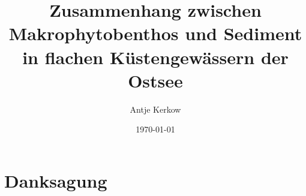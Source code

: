 



\pagestyle{empty}



\titlehead{Ernst Moritz Arndt Universität Greifswald\\
           Fachbereich Naturwissenschaften\\
           Institut für Landschaftsökologie und Naturschutz}

\subject{Diplomarbeit}

\title{Zusammenhang zwischen Makrophytobenthos und Sediment in flachen Küstengewässern der Ostsee}

\author{Antje Kerkow}

\date{\today} 

\publishers{Dozenten:\\PD Dr. Irmgard Blindow \\Prof. Dr. Hendrik Schubert}





\maketitle %
\clearpage

\section*{Danksagung}

\clearpage

\pagestyle{scrheadings}    %
\clearscrheadfoot

\cfoot{\pagemark}
\chead{\headmark}


\tableofcontents

